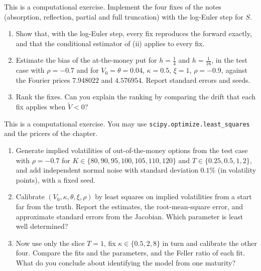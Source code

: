 \begin{exercise}\label{ex:sv-fixes}
\medium This is a computational exercise. Implement the four fixes of the notes (absorption, reflection,
partial and full truncation) with the log-Euler step for $S$.
\begin{enumerate}[label=(\alph*)]
  \item Show that, with the log-Euler step, every fix reproduces the forward exactly, and that the conditional
    estimator of (ii) applies to every fix.
  \item Estimate the bias of the at-the-money put for $h=\frac14$ and $h=\frac1{16}$, in the test case with
    $\rho=-0.7$ and for $V_0=\theta=0.04$, $\kappa=0.5$, $\xi=1$, $\rho=-0.9$, against the Fourier prices
    $7.948022$ and $4.576954$. Report standard errors and seeds.
  \item Rank the fixes. Can you explain the ranking by comparing the drift that each fix applies when
    $\tilde V<0$?
\end{enumerate}
\end{exercise}

\begin{exercise}\label{ex:sv-calibration}
\hard This is a computational exercise. You may use \texttt{scipy.optimize.least\_squares} and the pricers of the
chapter.
\begin{enumerate}[label=(\alph*)]
  \item Generate implied volatilities of out-of-the-money options from the test case with $\rho=-0.7$ for
    $K\in\{80,90,95,100,105,110,120\}$ and $T\in\{0.25,0.5,1,2\}$, and add independent normal noise with standard
    deviation $0.1\%$ (in volatility points), with a fixed seed.
  \item Calibrate $(V_0,\kappa,\theta,\xi,\rho)$ by least squares on implied volatilities from a start far from
    the truth. Report the estimates, the root-mean-square error, and approximate standard errors from the
    Jacobian. Which parameter is least well determined?
  \item Now use only the slice $T=1$, fix $\kappa\in\{0.5,2,8\}$ in turn and calibrate the other four. Compare the
    fits and the parameters, and the Feller ratio of each fit. What do you conclude about identifying the model
    from one maturity?
\end{enumerate}
\end{exercise}

